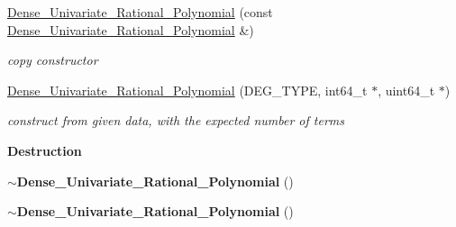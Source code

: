 \begin{Indent}
\begin{DoxyCompactItemize}
\mbox{\label{group__polygroup_a809d897a0cc6a226c42b80617c2aeab5}} 
\hyperlink{group__polygroup_a809d897a0cc6a226c42b80617c2aeab5}{Dense\+\_\+\+Univariate\+\_\+\+Rational\+\_\+\+Polynomial} (const \hyperlink{group__polygroup_class_dense___univariate___rational___polynomial}{Dense\+\_\+\+Univariate\+\_\+\+Rational\+\_\+\+Polynomial} \&)
\begin{DoxyCompactList}\small\item\em copy constructor \end{DoxyCompactList}\item 
\mbox{\label{group__polygroup_a355c74bb36083fa2407a28ac066ca081}} 
\hyperlink{group__polygroup_a355c74bb36083fa2407a28ac066ca081}{Dense\+\_\+\+Univariate\+\_\+\+Rational\+\_\+\+Polynomial} (D\+E\+G\+\_\+\+T\+Y\+PE, int64\+\_\+t $\ast$, uint64\+\_\+t $\ast$)
\begin{DoxyCompactList}\small\item\em construct from given data, with the expected number of terms \end{DoxyCompactList}\end{DoxyCompactItemize}
\end{Indent}
\begin{Indent}\textbf{ Destruction}\par
\begin{DoxyCompactItemize}
\item 
\mbox{\label{group__polygroup_aeade1e7c67dd64b79340aff7555e0354}} 
{\bfseries $\sim$\+Dense\+\_\+\+Univariate\+\_\+\+Rational\+\_\+\+Polynomial} ()
\item 
\mbox{\label{group__polygroup_aeade1e7c67dd64b79340aff7555e0354}} 
{\bfseries $\sim$\+Dense\+\_\+\+Univariate\+\_\+\+Rational\+\_\+\+Polynomial} ()
\end{DoxyCompactItemize}
\end{Indent}
